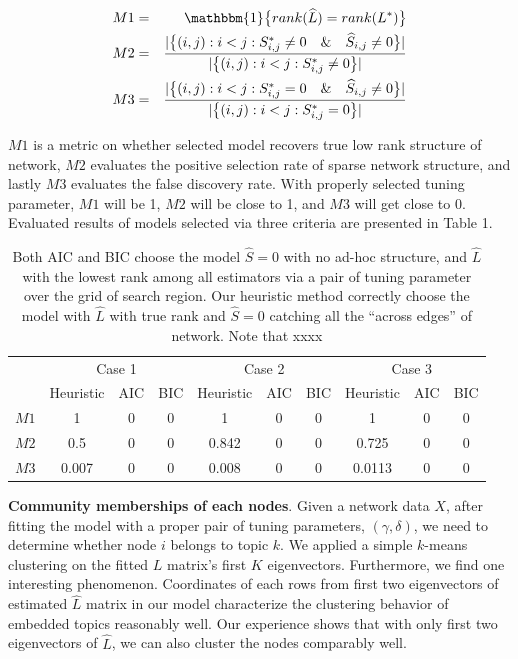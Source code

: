 \documentclass[AMS,STIX1COL]{WileyNJD-v2}
\begin{document}
\begin{eqnarray*}
M1 &=& \mathbbm{1}\big\{rank(\widehat{L}) = rank(L^{*})\big\} \\
M2 &=& \frac{|\big\{(i,j):i<j:S^{*}_{i,j} \neq0 \quad \& \quad \widehat{S}_{i,j} \neq 0 \big\}|}{|\big\{(i,j):i<j:S^{*}_{i,j}\neq0\big\}|} \\
M3 &=& \frac{|\big\{(i,j):i<j:S^{*}_{i,j} = 0 \quad \& \quad \widehat{S}_{i,j} \neq 0 \big\}|}{|\big\{(i,j):i<j:S^{*}_{i,j}=0\big\}|}
\end{eqnarray*}

$M1$ is a metric on whether selected model recovers true low rank structure of network,
$M2$ evaluates the positive selection rate of sparse network structure,
and lastly $M3$ evaluates the false discovery rate.
With properly selected tuning parameter, $M1$ will be 1, $M2$ will be close to 1, and $M3$ will get close to 0.
Evaluated results of models selected via three criteria are presented in Table 1.

\begin{table}[htbp]
\centering
\begin{tabular}{c|ccc|ccc|ccc}
   & \multicolumn{3}{c|}{Case 1} & \multicolumn{3}{c|}{Case 2} & \multicolumn{3}{c}{Case 3} \\ \cline{2-10}
   & Heuristic        & AIC    & BIC    & Heuristic        & AIC    & BIC    & Heuristic        & AIC    & BIC   \\ \hline
$M1$ & 1         & 0      & 0      & 1         & 0      & 0      & 1         & 0      & 0     \\
$M2$ & 0.5       & 0      & 0      & 0.842     & 0      & 0      & 0.725     & 0      & 0     \\
$M3$ & 0.007     & 0      & 0      & 0.008     & 0      & 0      & 0.0113    & 0      & 0
\end{tabular}
\caption{ Both AIC and BIC choose the model $\widehat{S}=0$ with no ad-hoc structure, and $\widehat{L}$ with the lowest rank among all estimators via a pair of tuning parameter over the grid of search region. Our heuristic method correctly choose the model with $\widehat{L}$ with true rank and $\widehat{S}=0$ catching all the ``across edges'' of network. Note that xxxx}
\label{tab:table1}
\end{table}


\textbf{Community memberships of each nodes}.
Given a network data $X$, after fitting the model with a proper pair of tuning parameters, $(\gamma,\delta)$, we need to determine whether node $i$ belongs to topic $k$.
We applied a simple $k$-means clustering on the fitted $L$ matrix's first $K$ eigenvectors.
Furthermore, we find one interesting phenomenon.
Coordinates of each rows from first two eigenvectors of estimated $\widehat{L}$ matrix in our model characterize the clustering behavior of embedded topics reasonably well.
Our experience shows that with only first two eigenvectors of $\widehat{L}$, we can also cluster the nodes comparably well.
\end{document}
